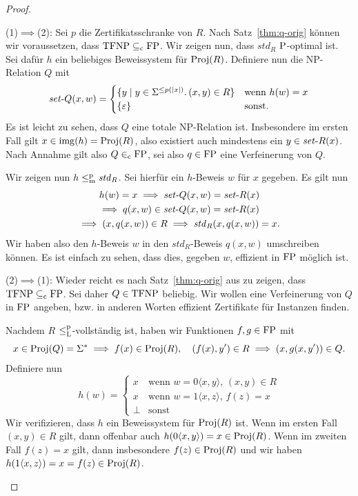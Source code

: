 \begin{proof}
    \begin{prooflist}
    \item (1)$\implies$(2): 
        Sei $p$ die Zertifikatsschranke von $R$.
        Nach Satz~\ref{thm:q-orig} können wir voraussetzen, dass $\TFNP\subseteqc\FP$.
        Wir zeigen nun, dass $\mathit{std}_R$ $\P$-optimal ist. Sei dafür $h$ ein beliebiges Beweissystem für $\Proj(R)$.
        Definiere nun die NP-Relation $Q$ mit
        \[ \fset{Q}(x, w) = \begin{cases} \{y \mid y\in\Sigma^{\leq p(|x|)}.\, (x,y)\in R \} & \text{wenn $h(w)=x$} \\ \{\epsilon\} & \text{sonst.} \end{cases} \]
        Es ist leicht zu sehen, dass $Q$ eine totale NP-Relation ist. Insbesondere im ersten Fall gilt $x\in \img(h)=\Proj(R)$, also existiert auch mindestens ein $y\in\fset{}R(x)$.
        Nach Annahme gilt also $Q\inc\FP$, sei also $q\in\FP$ eine Verfeinerung von $Q$.

        Wir zeigen nun $h\leqmp \mathit{std}_R$. Sei hierfür ein $h$-Beweis $w$ für $x$ gegeben.
        Es gilt nun
        \begin{gather*}
            h(w)=x\implies \fset{}Q(x,w) = \fset{}R(x)\\
            \implies q(x,w) \in \fset{}Q(x, w)=\fset{}R(x)\\
            \implies (x, q(x,w))\in R \implies \mathit{std}_R(x, q(x,w))=x.
        \end{gather*}
        Wir haben also den $h$-Beweis $w$ in den $\mathit{std}_R$-Beweis $q(x,w)$ umschreiben können. Es ist einfach zu sehen, dass dies, gegeben $w$, effizient in $\FP$ möglich ist.

    \item (2)$\implies$(1): Wieder reicht es nach Satz~\ref{thm:q-orig} aus zu zeigen, dass $\TFNP\subseteqc \FP$. Sei daher $Q\in\TFNP$ beliebig.
    Wir wollen eine Verfeinerung von $Q$ in $\FP$ angeben, bzw. in anderen Worten effizient Zertifikate für Instanzen finden.

    Nachdem $R$ $\leqlp$-vollständig ist, haben wir Funktionen $f,g\in\FP$ mit
    \[ x\in \Proj(Q)=\Sigma^*\implies  f(x)\in\Proj(R), \quad (f(x), y')\in R\implies (x,g(x,y'))\in Q. \]
    Definiere nun 
    \[ h(w) = \begin{cases} x & \text{wenn $w=0\langle x, y\rangle$, $(x,y)\in R$}\\ x & \text{wenn $w=1\langle x, z\rangle$, $f(z)=x$} \\ \bot & \text{sonst} \end{cases}\]
    Wir verifizieren, dass $h$ ein Beweissystem für $\Proj(R)$ ist.
    Wenn im ersten Fall $(x,y)\in R$ gilt, dann offenbar auch $h(0\langle x,y\rangle)=x\in\Proj(R)$.
    Wenn im zweiten Fall $f(z)=x$ gilt, dann insbesondere $f(z)\in\Proj(R)$ und wir haben $h(1\langle x,z\rangle)=x=f(z)\in \Proj(R)$.


\end{prooflist}
\end{proof}
